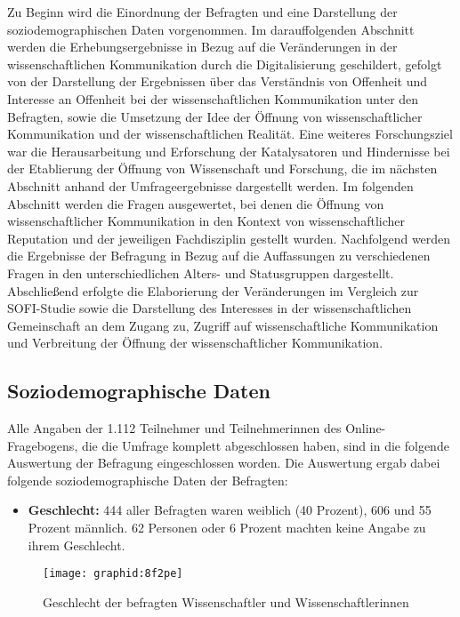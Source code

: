 Zu Beginn wird die Einordnung der Befragten und eine Darstellung der soziodemographischen Daten vorgenommen. Im darauffolgenden Abschnitt werden die Erhebungsergebnisse in Bezug auf die Veränderungen in der wissenschaftlichen Kommunikation durch die Digitalisierung geschildert, gefolgt von der Darstellung der Ergebnissen über das Verständnis von Offenheit und Interesse an Offenheit bei der wissenschaftlichen Kommunikation unter den Befragten, sowie die Umsetzung der Idee der Öffnung von wissenschaftlicher Kommunikation und der wissenschaftlichen Realität. Eine weiteres Forschungsziel war die Herausarbeitung und Erforschung der Katalysatoren und Hindernisse bei der Etablierung der Öffnung von Wissenschaft und Forschung, die im nächsten Abschnitt anhand der Umfrageergebnisse dargestellt werden. Im folgenden Abschnitt werden die Fragen ausgewertet, bei denen die Öffnung von wissenschaftlicher Kommunikation in den Kontext von wissenschaftlicher Reputation und der jeweiligen Fachdisziplin gestellt wurden. Nachfolgend werden die Ergebnisse der Befragung in Bezug auf die Auffassungen zu verschiedenen Fragen in den unterschiedlichen Alters- und Statusgruppen dargestellt. Abschließend erfolgte die Elaborierung der Veränderungen im Vergleich zur SOFI-Studie sowie die  Darstellung des Interesses in der wissenschaftlichen Gemeinschaft an dem Zugang zu, Zugriff auf wissenschaftliche Kommunikation und Verbreitung der Öffnung der wissenschaftlicher Kommunikation.

\subsection{Soziodemographische Daten}

Alle Angaben der 1.112 Teilnehmer und Teilnehmerinnen des Online-Fragebogens, die die Umfrage komplett abgeschlossen haben, sind in die folgende Auswertung der Befragung eingeschlossen worden. Die Auswertung ergab dabei folgende soziodemographische Daten der Befragten:

\begin{itemize}
\item \textbf{Geschlecht:} 444 aller Befragten waren weiblich (40 Prozent), 606 und 55 Prozent männlich. 62 Personen oder 6 Prozent machten keine Angabe zu ihrem Geschlecht.
\end{itemize}

\begin{figure}[h!]
\texttt{[image: graphid:8f2pe]}
\caption{Geschlecht der befragten Wissenschaftler und Wissenschaftlerinnen}
\end{figure}

